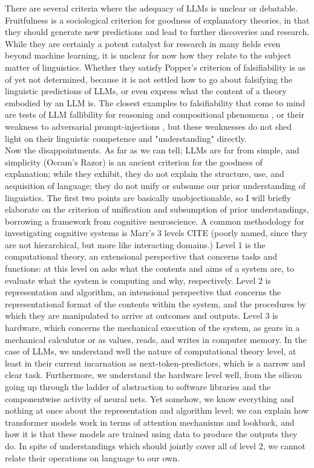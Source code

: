 There are several criteria where the adequacy of LLMs is unclear or debatable. Fruitfulness is a sociological criterion for goodness of explanatory theories, in that they should generate new predictions and lead to further discoveries and research. While they are certainly a potent catalyst for research in many fields even beyond machine learning, it is unclear for now how they relate to the subject matter of linguistics. Whether they satisfy Popper's criterion of falsifiability is as of yet not determined, because it is not settled how to go about falsifying the linguistic predictions of LLMs, or even express what the content of a theory embodied by an LLM is. The closest examples to falsifiability that come to mind are tests of LLM fallibility for reasoning and compositional phenomena \citep{dziri_faith_2023}, or their weakness to adversarial prompt-injections \citep{noauthor_riley_2022}, but these weaknesses do not shed light on their linguistic competence and "understanding" directly.\\

Now the disappointments. As far as we can tell; LLMs are far from simple, and simplicity (Occam's Razor) is an ancient criterion for the goodness of explanation; while they exhibit, they do not explain the structure, use, and acquisition of language; they do not unify or subsume our prior understanding of linguistics. The first two points are basically unobjectionable, so I will briefly elaborate on the criterion of unification and subsumption of prior understandings, borrowing a framework from cognitive neuroscience. A common methodology for investigating cognitive systems is Marr's 3 levels \bR CITE \e (poorly named, since they are not hierarchical, but more like interacting domains.) Level 1 is the computational theory, an extensional perspective that concerns tasks and functions: at this level on asks what the contents and aims of a system are, to evaluate what the system is computing and why, respectively. Level 2 is representation and algorithm, an intensional perspective that concerns the representational format of the contents within the system, and the procedures by which they are manipulated to arrive at outcomes and outputs. Level 3 is hardware, which concerns the mechanical execution of the system, as gears in a mechanical calculutor or as values, reads, and writes in computer memory. In the case of LLMs, we understand well the nature of computational theory level, at least in their current incarnation as next-token-predictors, which is a narrow and clear task. Furthermore, we understand the hardware level well, from the silicon going up through the ladder of abstraction to software libraries and the componentwise activity of neural nets. Yet somehow, we know everything and nothing at once about the representation and algorithm level; we can explain how transformer models work in terms of attention mechanisms and lookback, and how it is that these models are trained using data to produce the outputs they do. In spite of understandings which should jointly cover all of level 2, we cannot relate their operations on language to our own.

